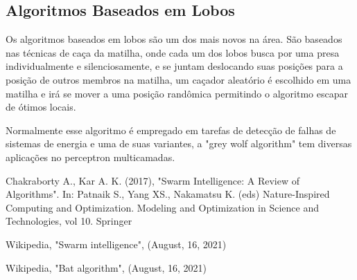 \documentclass[letterpaper, 10 pt, conference]{ieeeconf}  %
\begin{document}

\subsection{Algoritmos Baseados em Lobos}

Os algoritmos baseados em lobos são um dos mais novos na área. São baseados nas técnicas de caça da matilha, onde cada um dos lobos busca por uma presa individualmente e silenciosamente, e se juntam deslocando suas posições para a posição de outros membros na matilha, um caçador aleatório é escolhido em uma matilha e irá se mover a uma posição randômica permitindo o algoritmo escapar de ótimos locais.

Normalmente esse algoritmo é empregado em tarefas de detecção de falhas de sistemas de energia e uma de suas variantes, a "grey wolf algorithm" tem diversas aplicações no perceptron multicamadas.

\begin{thebibliography}{99}

 Chakraborty A., Kar A. K. (2017), "Swarm Intelligence: A Review of Algorithms".  In: Patnaik S., Yang XS., Nakamatsu K. (eds) Nature-Inspired Computing and Optimization. Modeling and Optimization in Science and Technologies, vol 10. Springer

 Wikipedia, "Swarm intelligence", (August, 16, 2021)

 Wikipedia, "Bat algorithm", (August, 16, 2021)

\end{thebibliography}
\end{document}
